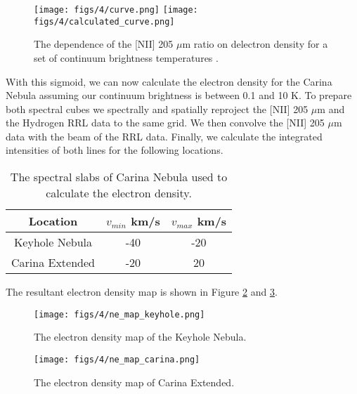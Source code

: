 \begin{figure}[h]
    \centering
    \texttt{[image: figs/4/curve.png]}
    \texttt{[image: figs/4/calculated\_curve.png]}
    \caption{The dependence of the [NII] 205 $\mu$m ratio on delectron density for a set of continuum brightness temperatures \cite{pineda2018}.}
    \label{fig:ne_vs_tc}
\end{figure}

With this sigmoid, we can now calculate the electron density for the Carina Nebula assuming our continuum brightness is between 0.1 and 10 K.
To prepare both spectral cubes we spectrally and spatially reproject the [NII] 205 $\mu$m and the Hydrogen RRL data to the same grid.
We then convolve the [NII] 205 $\mu$m data with the beam of the RRL data. 
Finally, we calculate the integrated intensities of both lines for the following locations.

\begin{table}[h!]
    \centering
    \begin{tabular}{|c|c|c|}
        \hline
        Location & $v_{min}$ km/s & $v_{max}$ km/s \\
        \hline
        Keyhole Nebula & -40 & -20 \\
        Carina Extended & -20 & 20 \\
        \hline
    \end{tabular}
    \caption{The spectral slabs of Carina Nebula used to calculate the electron density.}
    \label{tab:carina}
\end{table}

The resultant electron density map is shown in Figure \ref{fig:ne_map_keyhole} and \ref{fig:ne_map_carina}.

\begin{figure}[h]
    \centering
    \texttt{[image: figs/4/ne\_map\_keyhole.png]}
    \caption{The electron density map of the Keyhole Nebula.}
    \label{fig:ne_map_keyhole}
\end{figure}

\begin{figure}[h]
    \centering
    \texttt{[image: figs/4/ne\_map\_carina.png]}
    \caption{The electron density map of Carina Extended.}
    \label{fig:ne_map_carina}
\end{figure}